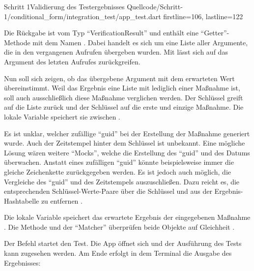 \begin{alexlisting}{Schritt 1}{Validierung des Testergebnisses}
  {Quellcode/Schritt-1/conditional_form/integration_test/app_test.dart}
  {firstline=106, lastline=122}

  \label{lst:Schritt1ButtonZumSpeichernWirdAusgelöst}
\end{alexlisting}

Die Rückgabe ist vom Typ \enquote{VerificationResult} und enthält eine \enquote{Getter}-Methode mit dem Namen .
Dabei handelt es sich um eine Liste aller Argumente, die in den vergangenen Aufrufen übergeben wurden.
Mit  lässt sich auf das Argument des letzten Aufrufes zurückgreifen.

Nun soll sich zeigen, ob das übergebene Argument mit dem erwarteten Wert übereinstimmt.
Weil das Ergebnis eine Liste mit lediglich einer Maßnahme ist, soll auch ausschließlich diese Maßnahme verglichen werden.
Der Schlüssel  greift auf die Liste zurück und der Schlüssel  auf die erste und einzige Maßnahme.
Die lokale Variable  speichert sie zwischen .

Es ist unklar, welcher zufällige \enquote{guid} bei der Erstellung der Maßnahme generiert wurde.
Auch der Zeitstempel hinter dem Schlüssel  ist unbekannt.
Eine mögliche Lösung wären weitere \enquote{Mocks}, welche die Erstellung des \enquote{guid} und des Datums überwachen.
Anstatt eines zufälligen \enquote{guid} könnte beispielsweise immer die gleiche Zeichenkette zurückgegeben werden.
Es ist jedoch auch möglich, die Vergleiche des \enquote{guid} und des Zeitstempels auszuschließen.
Dazu reicht es,
die entsprechenden Schlüssel-Werte-Paare über die Schlüssel  und
 aus der Ergebnis-Hashtabelle zu entfernen .

Die lokale Variable  speichert das erwartete Ergebnis der eingegebenen Maßnahme .
Die Methode  und der \enquote{Matcher}  überprüfen beide Objekte auf Gleichheit .

Der Befehl  startet den Test.
Die App öffnet sich und der Ausführung des Tests kann zugesehen werden.
Am Ende erfolgt in dem Terminal die Ausgabe des Ergebnisses: 

